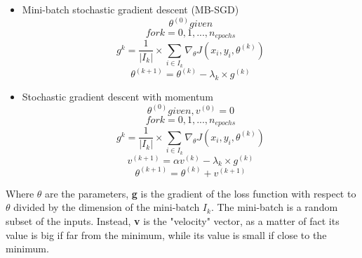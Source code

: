 \documentclass{article}
\begin{document}
\begin{itemize}
    \item Mini-batch stochastic gradient descent (MB-SGD)
    \begin{equation}\nonumber
        \theta^{(0)} given
    \end{equation}
    \begin{equation}\nonumber
        for k = 0,1,...,n_{epochs}
    \end{equation}
    \begin{equation}\nonumber
        g^{k} = \frac{1}{|I_k|} \times \sum_{i \in I_k} \nabla_{\theta} J(x_i , y_i , \theta^{(k)})
    \end{equation}
    \begin{equation}\nonumber
        \theta^{(k+1)} = \theta^{(k)} - \lambda_k \times g^{(k)}
    \end{equation}
    
    \item Stochastic gradient descent with momentum
    \begin{equation}\nonumber
        \theta^{(0)} given , v^{(0)} = 0
    \end{equation}
    \begin{equation}\nonumber
        for k = 0,1,...,n_{epochs}
    \end{equation}
    \begin{equation}\nonumber
        g^{k} = \frac{1}{|I_k|} \times \sum_{i \in I_k} \nabla_{\theta} J(x_i , y_i , \theta^{(k)})
    \end{equation}
    \begin{equation}\nonumber
        v^{(k+1)} = \alpha v^{(k)} - \lambda_k \times g^{(k)}
    \end{equation}
    \begin{equation}\nonumber
        \theta^{(k+1)} = \theta^{(k)} +  v^{(k+1)}
    \end{equation}
\end{itemize}

Where ${\theta}$ are the parameters, \textbf{g} is the gradient of the loss function with respect to ${\theta}$ divided by the dimension of the mini-batch \textbf{$I_{k}$}. \newline The mini-batch is a random subset of the inputs. Instead, \textbf{v} is the "velocity" vector, as a matter of fact its value is big if far from the minimum, while its value is small if close to the minimum.
\end{document}
